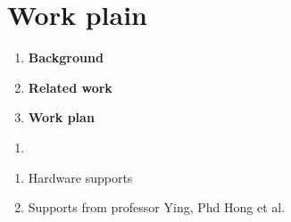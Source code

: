 \documentclass[aspectratio=1610,18pt]{ctexbeamer}
\begin{document}
\section{Work plain}
\begin{frame}
  \begin{enumerate}
    \Large
    \item \textbf{Background}
    \item \textbf{Related work}
    \item \textbf{Work plan}
  \end{enumerate}
\end{frame}
\begin{frame}
  \begin{enumerate}
    \Large
    \item 
  \end{enumerate}
\end{frame}
\begin{frame}
  \begin{enumerate}
    \item Hardware supports
    \item Supports from professor Ying, Phd Hong et al.
  \end{enumerate}
\end{frame}
\end{document}
